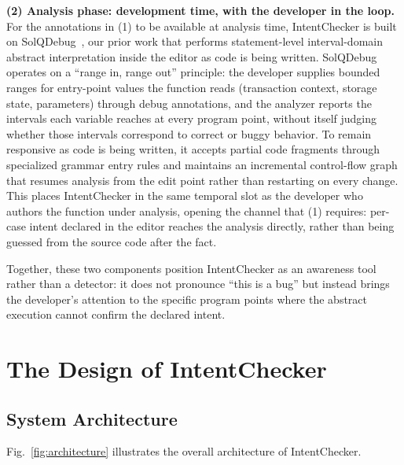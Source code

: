\documentclass[pdflatex,sn-basic]{sn-jnl}%
\theoremstyle{thmstyleone}%
\theoremstyle{thmstyletwo}%
\theoremstyle{thmstylethree}%
\begin{document}
\smallskip
\noindent\textbf{(2) Analysis phase: development time, with the developer in the loop.}
For the annotations in (1) to be available at analysis time, IntentChecker is built on SolQDebug~\citep{solqdebug}, our prior work that performs statement-level interval-domain abstract interpretation inside the editor as code is being written. SolQDebug operates on a ``range in, range out'' principle: the developer supplies bounded ranges for entry-point values the function reads (transaction context, storage state, parameters) through debug annotations, and the analyzer reports the intervals each variable reaches at every program point, without itself judging whether those intervals correspond to correct or buggy behavior. To remain responsive as code is being written, it accepts partial code fragments through specialized grammar entry rules and maintains an incremental control-flow graph that resumes analysis from the edit point rather than restarting on every change.
This places IntentChecker in the same temporal slot as the developer who authors the function under analysis, opening the channel that (1) requires: per-case intent declared in the editor reaches the analysis directly, rather than being guessed from the source code after the fact.

\smallskip
Together, these two components position IntentChecker as an awareness tool rather than a detector: it does not pronounce ``this is a bug'' but instead brings the developer's attention to the specific program points where the abstract execution cannot confirm the declared intent.

\section{The Design of IntentChecker}\label{sec:design}
\subsection{System Architecture}

Fig.~\ref{fig:architecture} illustrates the overall architecture of IntentChecker.
\end{document}

